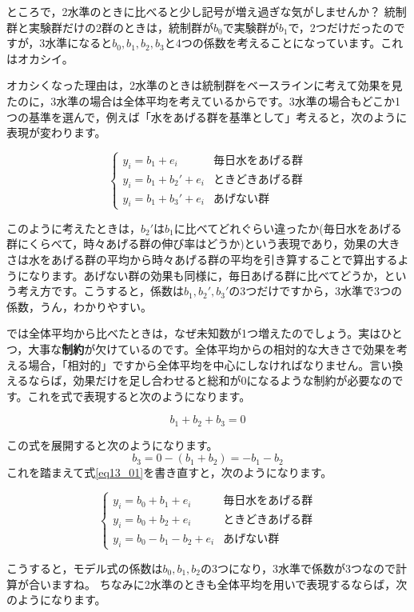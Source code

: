 \documentclass{ltjbook}
\begin{document}
ところで，2水準のときに比べると少し記号が増え過ぎな気がしませんか？ 統制群と実験群だけの2群のときは，統制群が$b_0$で実験群が$b_1$で，2つだけだったのですが，3水準になると$b_0,b_1,b_2,b_3$と4つの係数を考えることになっています。これはオカシイ。

オカシくなった理由は，2水準のときは統制群をベースラインに考えて効果を見たのに，3水準の場合は全体平均を考えているからです。3水準の場合もどこか1つの基準を選んで，例えば「水をあげる群を基準として」考えると，次のように表現が変わります。

\[
  \begin{cases}
    y_i = b_1 + e_i & \mbox{毎日水をあげる群}\\
    y_i = b_1 + b_2' + e_i & \mbox{ときどきあげる群}\\
    y_i = b_1 + b_3' + e_i & \mbox{あげない群}
  \end{cases}
\]

このように考えたときは，$b_2'$は$b_1$に比べてどれぐらい違ったか(毎日水をあげる群にくらべて，時々あげる群の伸び率はどうか)という表現であり，効果の大きさは水をあげる群の平均から時々あげる群の平均を引き算することで算出するようになります。あげない群の効果も同様に，毎日あげる群に比べてどうか，という考え方です。こうすると，係数は$b_1,b_2',b_3'$の3つだけですから，3水準で3つの係数，うん，わかりやすい。

では全体平均から比べたときは，なぜ未知数が1つ増えたのでしょう。実はひとつ，大事な\textbf{制約}が欠けているのです。全体平均からの相対的な大きさで効果を考える場合，「相対的」ですから全体平均を中心にしなければなりません。言い換えるならば，効果だけを足し合わせると総和が0になるような制約が必要なのです。これを式で表現すると次のようになります。

\[ b_1 + b_2 + b_3 = 0 \]

この式を展開すると次のようになります。
\[ b_3 = 0 - (b_1 + b_2) = -b_1 - b_2 \]
これを踏まえて式\ref{eq13_01}を書き直すと，次のようになります。

\[
\label{eq13_02}
  \begin{cases}
    y_i = b_0 + b_1 + e_i & \mbox{毎日水をあげる群}\\
    y_i = b_0 + b_2 + e_i & \mbox{ときどきあげる群}\\
    y_i = b_0 - b_1 - b_2 + e_i & \mbox{あげない群}
  \end{cases}
\]

こうすると，モデル式の係数は$b_0,b_1,b_2$の3つになり，3水準で係数が3つなので計算が合いますね。
ちなみに2水準のときも全体平均を用いで表現するならば，次のようになります。
\end{document}
